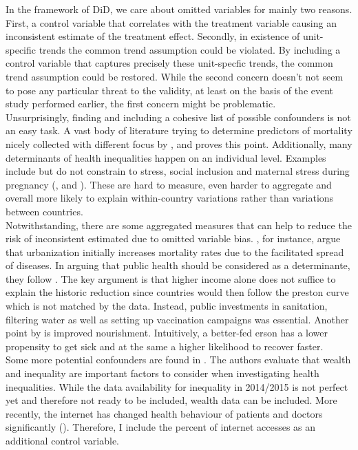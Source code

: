 \documentclass{article}
\begin{document}
In the framework of DiD, we care about omitted variables for mainly two reasons. First, a control variable that correlates with the treatment variable causing an inconsistent estimate of the treatment effect. Secondly, in existence of unit-specific trends the common trend assumption could be violated. By including a control variable that captures precisely these unit-specfic trends, the common trend assumption could be restored. While the second concern doesn't not seem to pose any particular threat to the validity, at least on the basis of the event study performed earlier, the first concern might be problematic.\\
Unsurprisingly, finding and including a cohesive list of possible confounders is not an easy task. A vast body of literature trying to determine predictors of mortality nicely collected with different focus by \cite{cutler2006determinants}, \cite{soares2007determinants} and \cite{arcaya2015inequalities} proves this point. Additionally, many determinants of health inequalities happen on an individual level. Examples include but do not constrain to stress, social inclusion and 
maternal stress during pregnancy (\cite{thoits2010stress}, \cite{cohen2004social} and \cite{almond2011killing}). These are hard to measure, even harder to aggregate and overall more likely to explain within-country variations rather than variations between countries. \\
Notwithstanding, there are some aggregated measures that can help to reduce the risk of inconsistent estimated due to omitted variable bias. \cite{cutler2006determinants}, for instance, argue that urbanization initially increases mortality rates due to the facilitated spread of diseases. In arguing that public health should be considered as a determinante, they follow \cite{preston1975changing}. The key argument is that higher income alone does not suffice to explain the historic reduction since countries would then follow the preston curve which is not matched by the data. Instead, public investments in sanitation, filtering water as well as setting up vaccination campaigns was essential. Another point by \cite{cutler2006determinants} is improved nourishment. Intuitively, a better-fed erson has a lower propensity to get sick and at the same a higher likelihood to recover faster.\\
Some more potential confounders are found in \cite{marmot2005social}. The authors evaluate that wealth and inequality are important factors to consider when investigating health inequalities. While the data availability for inequality in 2014/2015 is not perfect yet and therefore not ready to be included, wealth data can be included. More recently, the internet has changed health behaviour of patients and doctors significantly (\cite{cook2008internet}). Therefore, I include the percent of internet accesses as an additional control variable.\\
\end{document}
